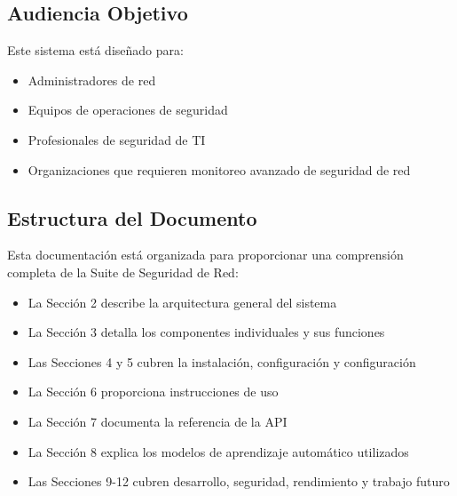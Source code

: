 \subsection{Audiencia Objetivo}
Este sistema está diseñado para:
\begin{itemize}
    \item Administradores de red
    \item Equipos de operaciones de seguridad
    \item Profesionales de seguridad de TI
    \item Organizaciones que requieren monitoreo avanzado de seguridad de red
\end{itemize}

\subsection{Estructura del Documento}
Esta documentación está organizada para proporcionar una comprensión completa de la Suite de Seguridad de Red:
\begin{itemize}
    \item La Sección 2 describe la arquitectura general del sistema
    \item La Sección 3 detalla los componentes individuales y sus funciones
    \item Las Secciones 4 y 5 cubren la instalación, configuración y configuración
    \item La Sección 6 proporciona instrucciones de uso
    \item La Sección 7 documenta la referencia de la API
    \item La Sección 8 explica los modelos de aprendizaje automático utilizados
    \item Las Secciones 9-12 cubren desarrollo, seguridad, rendimiento y trabajo futuro
\end{itemize}